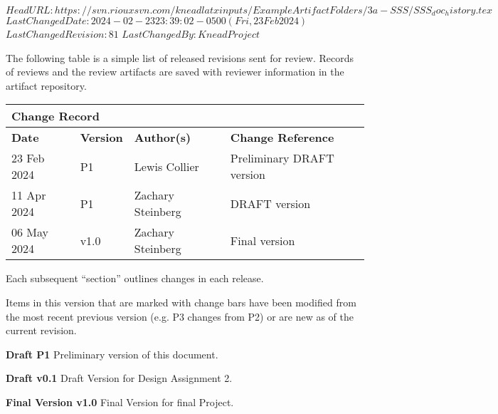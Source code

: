 \svnidlong
{$HeadURL: https://svn.riouxsvn.com/kneadlatxinputs/ExampleArtifactFolders/3a-SSS/SSS_doc_history.tex $}
{$LastChangedDate: 2024-02-23 23:39:02 -0500 (Fri, 23 Feb 2024) $}
{$LastChangedRevision: 81 $}
{$LastChangedBy: KneadProject $}

The following table is a simple list of released revisions sent for review.
Records of reviews and the review artifacts are saved with reviewer information in the \KNEADagencyName artifact repository.

\begin{table}[h]
	\centering 
		\begin{tabular}{|p{1.0in}|p{0.8in}|p{1.4in}|p{2.1in}|}
    \multicolumn{4}{l}{\bfseries Change Record} \\
		\hline
			{\bfseries Date}  &  {\bfseries Version} & {\bfseries Author(s)} & {\bfseries Change Reference} \\
		\hline
		\hline
			 23 Feb 2024	&	\centering	P1	&	{\raggedright Lewis Collier}	&	Preliminary DRAFT version  \\ \hline
			 11 Apr 2024	&	\centering	P1	&	{\raggedright Zachary Steinberg}	&	DRAFT version  \\ \hline
			 06 May 2024	&	\centering	v1.0	&	{\raggedright Zachary Steinberg}	&	Final version \\ \hline
		\hline		\hline				
  	\end{tabular}
\end{table}

Each subsequent ``section'' outlines changes in each release.

Items in this version that are marked with change bars have been modified from the most recent previous version (e.g. P3 changes from P2) or are new as of the current revision. 

{\bf Draft P1}
Preliminary version of this document.

{\bf Draft v0.1}
Draft Version for Design Assignment 2.

{\bf Final Version v1.0}
Final Version for final Project.


